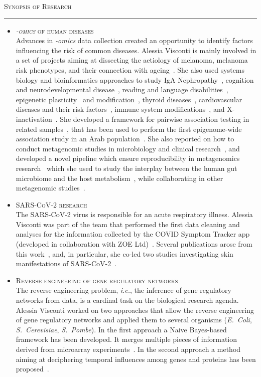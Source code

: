 \documentclass[a4paper,10pt]{article}
\newcommand{\mediumtitle}[1]{
	\vspace{0.2cm}
	{\noindent
	\Large \textsc{#1}\\[-2ex]
	\hrule
	\vspace{0.2cm}}
}
\newcommand{\smalltitle}[1]{
	\vspace{0.1cm}
	{\noindent 
	\large \textsc{#1}}
	\vspace{0.1cm}
}
\newcommand{\bulletitem}{\item[$\bullet$]}
\begin{document}
\newpage


\mediumtitle{Synopsis of Research}

\begin{itemize}
	
\bulletitem \smalltitle{\emph{-omics} of human diseases}\\
Advances in \emph{-omics} data collection created an opportunity to identify factors influencing the risk of common diseases. Alessia Visconti is mainly involved in a set of projects aiming at dissecting the aetiology of melanoma, melanoma risk phenotypes, and their connection with ageing~\cite{Rib16,Pui16,Hys18,Vis18a,Duf17,Vis19a,Vis20,Lan20,San20,Gro21,Swi15}. 
She also used systems biology and bioinformatics approaches to study IgA Nephropathy~\cite{Lom16,Dot21}, cognition and neurodevelopmental disease~\cite{Joh15,Cul18}, reading and language disabilities~\cite{Gia16}, epigenetic plasticity~\cite{Car16} and modification~\cite{Zag18}, thyroid diseases~\cite{Mar20}, cardiovascular diseases and their risk factors~\cite{Ros21}, immune system modifications~\cite{Pia21}, and X-inactivation~\cite{Zit21}. 
She developed a framework for pairwise association testing in related samples~\cite{Vis16}, that has been used to perform the first epigenome-wide association study in an Arab population~\cite{AlM15}. 
She also reported on how to conduct metagenomic studies in microbiology and clinical research~\cite{Vis18c}, and developed a novel pipeline which ensure reproducibility in metagenomics research~\cite{Vis18b} which she used to study the interplay between the human gut microbiome and the host metabolism~\cite{Vis19}, while collaborating in other metagenomic studies~\cite{Bar20,LeR22}.

\bulletitem \smalltitle{SARS-CoV-2 research}\\
The SARS-CoV-2 virus is responsible for an acute respiratory illness.
Alessia Visconti was part of the team that performed the first data cleaning and analyses for the information collected by the COVID Symptom Tracker app (developed in collaboration with ZOE Ltd)~\cite{Mur21}. Several publications arose from this work~\cite{Men20,Lee20, Zaz20,Hop21,Wil21,Sud21}, and, in particular, she co-led two studies investigating skin manifestations of SARS-CoV-2~\cite{Vis21, Vis22}.

\bulletitem \smalltitle{Reverse engineering of gene regulatory networks}\\
The reverse engineering problem, \emph{i.e.}, the inference of gene regulatory networks from data, is a cardinal task on the biological research agenda.
Alessia Visconti worked on two approaches that allow the reverse engineering of gene regulatory networks and applied them to several organisms (\emph{E.~Coli}, \emph{S.~Cerevisiae}, \emph{S.~Pombe}). In the first approach a Naive Bayes-based framework has been developed. It merges multiple pieces of information derived from microarray experiments~\cite{Mar12, Vis11b}. In the second approach a method aiming at deciphering temporal influences among genes and proteins has been proposed~\cite{Vis12b}. 


\end{itemize}
\end{document}
